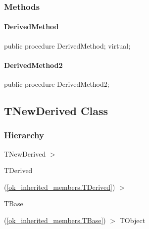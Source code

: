 \documentclass{report}
\begin{document}
\subsubsection*{\large{\textbf{Methods}}\normalsize\hspace{1ex}\hfill}
\paragraph*{DerivedMethod}\hspace*{\fill}

\begin{list}{}{
\setlength{\itemindent}{0cm}
\setlength{\listparindent}{0cm}
\setlength{\leftmargin}{\evensidemargin}
\addtolength{\leftmargin}{\tmplength}
\settowidth{\labelsep}{X}
\addtolength{\leftmargin}{\labelsep}
\setlength{\labelwidth}{\tmplength}
}
\begin{flushleft}
\item[\textbf{Declaration}\hfill]
\begin{ttfamily}
public procedure DerivedMethod; virtual;\end{ttfamily}


\end{flushleft}
\end{list}
\paragraph*{DerivedMethod2}\hspace*{\fill}

\begin{list}{}{
\setlength{\itemindent}{0cm}
\setlength{\listparindent}{0cm}
\setlength{\leftmargin}{\evensidemargin}
\addtolength{\leftmargin}{\tmplength}
\settowidth{\labelsep}{X}
\addtolength{\leftmargin}{\labelsep}
\setlength{\labelwidth}{\tmplength}
}
\begin{flushleft}
\item[\textbf{Declaration}\hfill]
\begin{ttfamily}
public procedure DerivedMethod2;\end{ttfamily}


\end{flushleft}
\end{list}
\subsection*{TNewDerived Class}
\subsubsection*{\large{\textbf{Hierarchy}}\normalsize\hspace{1ex}\hfill}
TNewDerived {$>$} \begin{ttfamily}TDerived\end{ttfamily}(\ref{ok_inherited_members.TDerived}) {$>$} \begin{ttfamily}TBase\end{ttfamily}(\ref{ok_inherited_members.TBase}) {$>$} 
TObject
\end{document}
